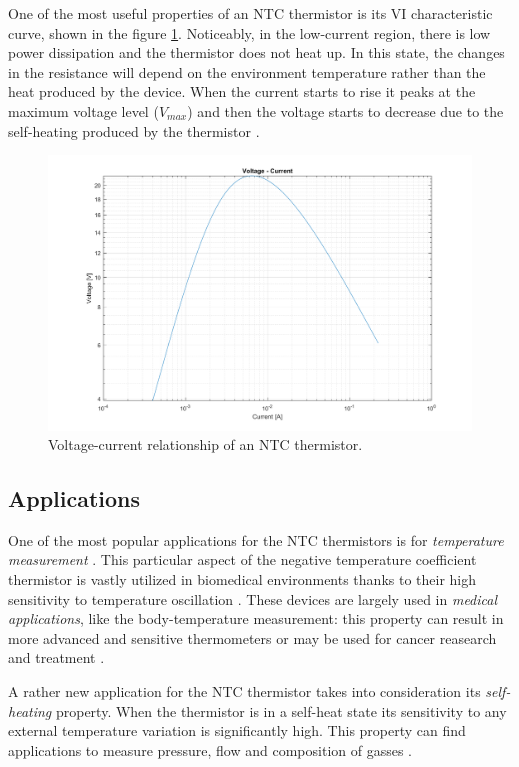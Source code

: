 \FloatBarrier\noindent One of the most useful properties of an NTC thermistor is its VI characteristic curve, shown in the figure \ref{fig:NTC_curr-volt}. Noticeably, in the low-current region, there is low power dissipation and the thermistor does not heat up. In this state, the changes in the resistance will depend on the environment temperature rather than the heat produced by the device. When the current starts to rise it peaks at the maximum voltage level ($V_{max}$) and then the voltage starts to decrease due to the self-heating produced by the thermistor \cite{Jagtap201182}.

\begin{figure}[h]
    \centering
    \includegraphics[width = .75\textwidth]{../res/plots/NTC_curr-volt.png}
    \caption{Voltage-current relationship of an NTC thermistor.}
    \label{fig:NTC_curr-volt}
\end{figure}


\FloatBarrier \subsection{Applications}
One of the most popular applications for the NTC thermistors is for \textit{temperature measurement} \cite{Chen20091103}\cite{Altenburg20011787}. This particular aspect of the negative temperature coefficient thermistor is vastly utilized in biomedical environments thanks to their high sensitivity to temperature oscillation \cite{Chen20091103}\cite{jones2010biomedical}. These devices are largely used in \textit{medical applications}, like the body-temperature measurement: this property can result in more advanced and sensitive thermometers or may be used for cancer reasearch and treatment \cite{Feteira2009967}.

A rather new application for the NTC thermistor takes into consideration its \textit{self-heating} property. When the thermistor is in a self-heat state its sensitivity to any external temperature variation is significantly high. This property can find applications to measure pressure, flow and composition of gasses \cite{Jagtap201182}.

